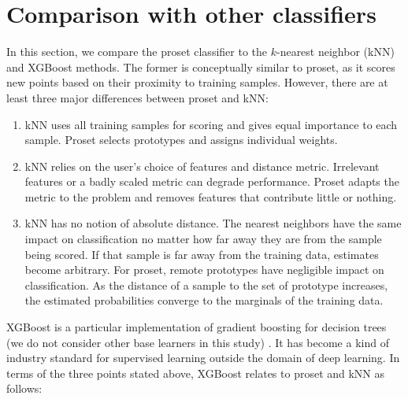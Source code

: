 \section{Comparison with other classifiers}
\label{sec_classifier_comparison}
%
\begin{center}\end{center}
%
In this section, we compare the proset classifier to the $k$-nearest neighbor (kNN) and XGBoost methods.
The former is conceptually similar to proset, as it scores new points based on their proximity to training samples.
However, there are at least three major differences between proset and kNN:
%
\begin{enumerate}
\item kNN uses all training samples for scoring and gives equal importance to each sample.
Proset selects prototypes and assigns individual weights.
%
\item kNN relies on the user's choice of features and distance metric.
Irrelevant features or a badly scaled metric can degrade performance.
Proset adapts the metric to the problem and removes features that contribute little or nothing.
%
\item kNN has no notion of absolute distance.
The nearest neighbors have the same impact on classification no matter how far away they are from the sample being scored.
If that sample is far away from the training data, estimates become arbitrary.
For proset, remote prototypes have negligible impact on classification.
As the distance of a sample to the set of prototype increases, the estimated probabilities converge to the marginals of the training data.
\end{enumerate}
%
XGBoost is a particular implementation of gradient boosting for decision trees (we do not consider other base learners in this study) \cite{Chen_16}.
It has become a kind of industry standard for supervised learning outside the domain of deep learning.
In terms of the three points stated above, XGBoost relates to proset and kNN as follows:
%

